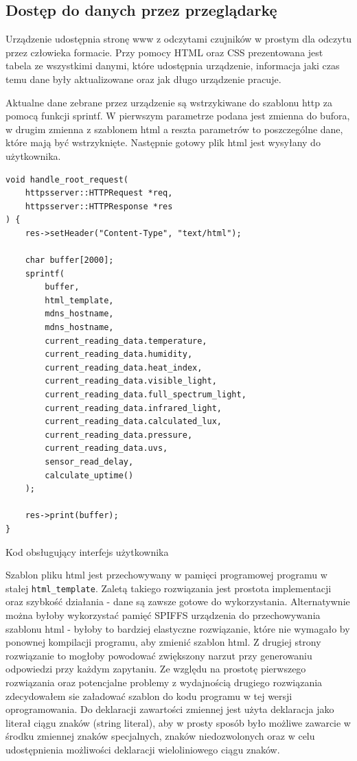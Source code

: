 \documentclass[12pt,a4paper]{article}
\begin{document}
\subsection{Dostęp do danych przez przeglądarkę}

Urządzenie udostępnia stronę www z odczytami czujników w prostym dla odczytu przez człowieka formacie. Przy pomocy HTML oraz CSS prezentowana jest tabela ze wszystkimi danymi, które udostępnia urządzenie, informacja jaki czas temu dane były aktualizowane oraz jak długo urządzenie pracuje.

Aktualne dane zebrane przez urządzenie są wstrzykiwane do szablonu http za pomocą funkcji sprintf. W pierwszym parametrze podana jest zmienna do bufora, w drugim zmienna z szablonem html a reszta parametrów to poszczególne dane, które mają być wstrzyknięte. Następnie gotowy plik html jest wysyłany do użytkownika.


\begin{code}[H]
\begin{verbatim}
void handle_root_request(
    httpsserver::HTTPRequest *req, 
    httpsserver::HTTPResponse *res
) {
    res->setHeader("Content-Type", "text/html");

    char buffer[2000];
    sprintf(
        buffer, 
        html_template,
        mdns_hostname,
        mdns_hostname,
        current_reading_data.temperature,
        current_reading_data.humidity,
        current_reading_data.heat_index,
        current_reading_data.visible_light,
        current_reading_data.full_spectrum_light,
        current_reading_data.infrared_light,
        current_reading_data.calculated_lux,
        current_reading_data.pressure,
        current_reading_data.uvs,
        sensor_read_delay,
        calculate_uptime()
    );

    res->print(buffer);
}
\end{verbatim}
\caption{Kod obsługujący interfejs użytkownika}
\label{user-interface-code}
\end{code}

Szablon pliku html jest przechowywany w pamięci programowej programu w stałej \texttt{html\_template}. Zaletą takiego rozwiązania jest prostota implementacji oraz szybkość działania - dane są zawsze gotowe do wykorzystania. Alternatywnie można byłoby wykorzystać pamięć SPIFFS urządzenia do przechowywania szablonu html - byłoby to bardziej elastyczne rozwiązanie, które nie wymagało by ponownej kompilacji programu, aby zmienić szablon html. Z drugiej strony rozwiązanie to mogłoby powodować zwiększony narzut przy generowaniu odpowiedzi przy każdym zapytaniu. Ze względu na prostotę pierwszego rozwiązania oraz potencjalne problemy z wydajnością drugiego rozwiązania zdecydowałem sie załadować szablon do kodu programu w tej wersji oprogramowania. Do deklaracji zawartości zmiennej jest użyta deklaracja jako literał ciągu znaków (string literal), aby w prosty sposób było możliwe zawarcie w środku zmiennej znaków specjalnych, znaków niedozwolonych oraz w celu udostępnienia możliwości deklaracji wieloliniowego ciągu znaków.
\end{document}
